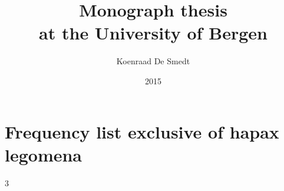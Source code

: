 \documentclass[a4paper,12pt]{book} %
\author{Koenraad De Smedt} %
\title{Monograph thesis \\ at the University of Bergen} %
\date{2015}
\begin{document}
\frontmatter






\tableofcontents

\mainmatter

\renewcommand{\chaptermark}[1]{\markboth{\small \thechapter. #1}{}}



\appendix
\renewcommand{\chaptermark}[1]{\markboth{\small Appendix \thechapter. #1}{}}

\chapter{Frequency list exclusive of hapax legomena} \label{app:freq}
\begin{multicols}{3}
{\footnotesize}
\end{multicols}

\backmatter
{} {}


\end{document}
